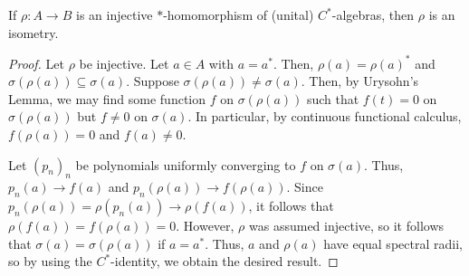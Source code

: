 \documentclass[10pt]{mypackage}
\begin{document}
\begin{proposition}
  If $\rho\colon A\to B$ is an injective $\ast$-homomorphism of (unital) $C^{\ast}$-algebras, then $\rho$ is an isometry.
\end{proposition}
\begin{proof}
  Let $\rho$ be injective. Let $a\in A$ with $a = a^{\ast}$. Then, $\rho(a) = \rho(a)^{\ast}$ and $\sigma\left( \rho(a) \right)\subseteq \sigma\left( a \right)$. Suppose $\sigma\left( \rho(a) \right)\neq \sigma\left( a \right)$. Then, by Urysohn's Lemma, we may find some function $f$ on $\sigma\left( \rho(a) \right)$ such that $f(t) = 0$ on $\sigma\left( \rho(a) \right)$ but $f\neq 0$ on $\sigma\left( a \right)$. In particular, by continuous functional calculus, $f\left( \rho(a) \right) = 0$ and $f(a)\neq 0$.

  Let $\left( p_n \right)_n$ be polynomials uniformly converging to $f$ on $\sigma(a)$. Thus, $p_n\left( a \right) \to f(a)$ and $p_n\left( \rho(a) \right)\to f\left( \rho(a) \right)$. Since $p_n\left( \rho(a) \right) = \rho\left( p_n(a) \right)\to \rho\left( f(a) \right)$, it follows that $\rho\left( f(a) \right) = f\left( \rho(a) \right) = 0$. However, $\rho$ was assumed injective, so it follows that $\sigma\left( a \right) = \sigma\left( \rho(a) \right)$ if $a = a^{\ast}$. Thus, $a$ and $\rho(a)$ have equal spectral radii, so by using the $C^{\ast}$-identity, we obtain the desired result.
\end{proof}
\end{document}
